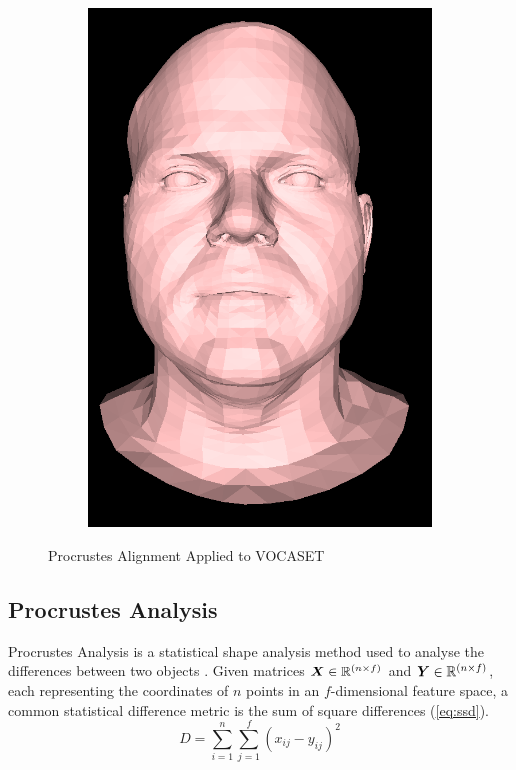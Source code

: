 \begin{figure}[h]
\begin{subfigure}[b]{0.4\textwidth}
        \includegraphics[width=\textwidth]{figures/dataset/subject2_aligned.png}
    \end{subfigure}
    \caption{Procrustes Alignment Applied to VOCASET \cite{Cudeiro2019}}\label{fig:VOCASET_Alignment}
\end{figure}

\subsection{Procrustes Analysis} \label{sec:procrustes_analysis}
Procrustes Analysis is a statistical shape analysis method used to analyse the differences between two objects \cite{Krzanowski2000}.
Given matrices ${\boldsymbol{{X}}} \in \mathbb{R}^{(n\times f)}$ and ${\boldsymbol{{Y}}} \in \mathbb{R}^{(n\times f)}$, each representing the coordinates of $n$ points in an $f$-dimensional feature space, a common statistical difference metric is the sum of square differences (\ref{eq:ssd}).
\begin{equation}
    \label{eq:ssd}
    D = \sum_{i=1}^{n} \sum_{j=1}^{f} (x_{ij} - y_{ij})^2
\end{equation}

